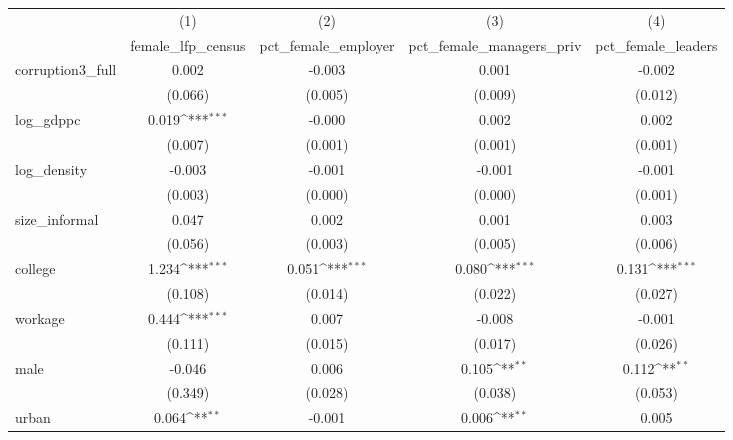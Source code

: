 {
\def\sym#1{\ifmmode^{#1}\else\(^{#1}\)\fi}
\begin{tabular}{l*{4}{c}}
\hline\hline
            &\multicolumn{1}{c}{(1)}&\multicolumn{1}{c}{(2)}&\multicolumn{1}{c}{(3)}&\multicolumn{1}{c}{(4)}\\
            &\multicolumn{1}{c}{female\_lfp\_census}&\multicolumn{1}{c}{pct\_female\_employer}&\multicolumn{1}{c}{pct\_female\_managers\_priv}&\multicolumn{1}{c}{pct\_female\_leaders}\\
\hline
corruption3\_full&       0.002         &      -0.003         &       0.001         &      -0.002         \\
            &     (0.066)         &     (0.005)         &     (0.009)         &     (0.012)         \\
[1em]
log\_gdppc   &       0.019\sym{***}&      -0.000         &       0.002         &       0.002         \\
            &     (0.007)         &     (0.001)         &     (0.001)         &     (0.001)         \\
[1em]
log\_density &      -0.003         &      -0.001         &      -0.001         &      -0.001         \\
            &     (0.003)         &     (0.000)         &     (0.000)         &     (0.001)         \\
[1em]
size\_informal&       0.047         &       0.002         &       0.001         &       0.003         \\
            &     (0.056)         &     (0.003)         &     (0.005)         &     (0.006)         \\
[1em]
college     &       1.234\sym{***}&       0.051\sym{***}&       0.080\sym{***}&       0.131\sym{***}\\
            &     (0.108)         &     (0.014)         &     (0.022)         &     (0.027)         \\
[1em]
workage     &       0.444\sym{***}&       0.007         &      -0.008         &      -0.001         \\
            &     (0.111)         &     (0.015)         &     (0.017)         &     (0.026)         \\
[1em]
male        &      -0.046         &       0.006         &       0.105\sym{**} &       0.112\sym{**} \\
            &     (0.349)         &     (0.028)         &     (0.038)         &     (0.053)         \\
[1em]
urban       &       0.064\sym{**} &      -0.001         &       0.006\sym{**} &       0.005         \\

\end{tabular}}
